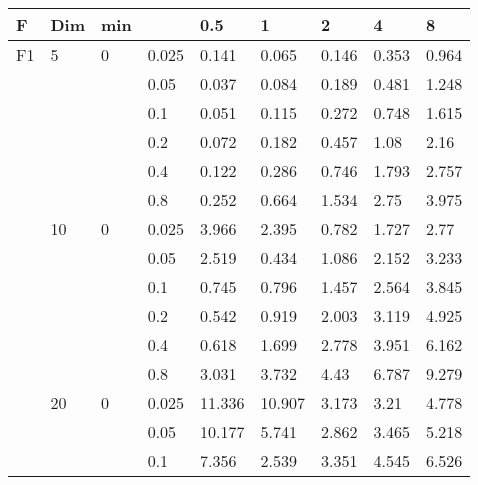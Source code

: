 \begin{longtable}{|l|l|l|l|l|l|l|l|l|}
\toprule
F              & Dim & min      & \diagbox{$\eta$}{$\sigma$} & 0.5        & 1          & 2          & 4          & 8          \\ \midrule
\endhead
\midrule
\endfoot
F1             & 5   & 0        & 0.025          & 0.141      & 0.065      & 0.146      & 0.353      & 0.964      \\
\cmidrule{4-9} &     &          & 0.05           & 0.037      & 0.084      & 0.189      & 0.481      & 1.248      \\
\cmidrule{4-9} &     &          & 0.1            & 0.051      & 0.115      & 0.272      & 0.748      & 1.615      \\
\cmidrule{4-9} &     &          & 0.2            & 0.072      & 0.182      & 0.457      & 1.08       & 2.16       \\
\cmidrule{4-9} &     &          & 0.4            & 0.122      & 0.286      & 0.746      & 1.793      & 2.757      \\
\cmidrule{4-9} &     &          & 0.8            & 0.252      & 0.664      & 1.534      & 2.75       & 3.975      \\
\cmidrule{2-9} & 10  & 0        & 0.025          & 3.966      & 2.395      & 0.782      & 1.727      & 2.77       \\
\cmidrule{4-9} &     &          & 0.05           & 2.519      & 0.434      & 1.086      & 2.152      & 3.233      \\
\cmidrule{4-9} &     &          & 0.1            & 0.745      & 0.796      & 1.457      & 2.564      & 3.845      \\
\cmidrule{4-9} &     &          & 0.2            & 0.542      & 0.919      & 2.003      & 3.119      & 4.925      \\
\cmidrule{4-9} &     &          & 0.4            & 0.618      & 1.699      & 2.778      & 3.951      & 6.162      \\
\cmidrule{4-9} &     &          & 0.8            & 3.031      & 3.732      & 4.43       & 6.787      & 9.279      \\
\cmidrule{2-9} & 20  & 0        & 0.025          & 11.336     & 10.907     & 3.173      & 3.21       & 4.778      \\
\cmidrule{4-9} &     &          & 0.05           & 10.177     & 5.741      & 2.862      & 3.465      & 5.218      \\
\cmidrule{4-9} &     &          & 0.1            & 7.356      & 2.539      & 3.351      & 4.545      & 6.526      \\

\end{longtable}
